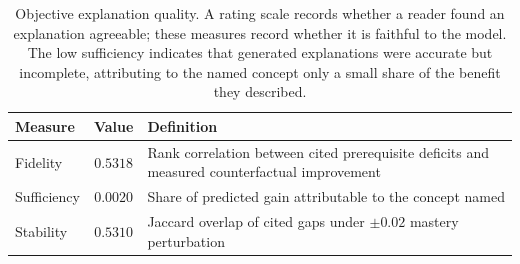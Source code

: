 \begin{table}[t]
\centering
\caption{Objective explanation quality. A rating scale records whether a reader
found an explanation agreeable; these measures record whether it is faithful to the
model. The low sufficiency indicates that generated explanations were accurate but
incomplete, attributing to the named concept only a small share of the benefit they
described.}
\label{tab:explanation}
\begin{tabular}{lcp{4.1cm}}
\toprule
Measure & Value & Definition \\
\midrule
Fidelity    & $0.5318$ & Rank correlation between cited prerequisite deficits and measured counterfactual improvement \\
Sufficiency & $0.0020$ & Share of predicted gain attributable to the concept named \\
Stability   & $0.5310$ & Jaccard overlap of cited gaps under $\pm 0.02$ mastery perturbation \\
\bottomrule
\end{tabular}
\end{table}


